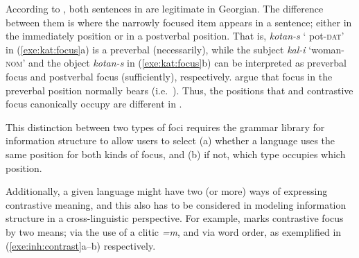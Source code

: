 

\noindent According to \citeauthor{skopeteas:fanselow:10}, both
sentences in  are legitimate in Georgian. The
difference between them is where the narrowly focused item appears in
a sentence; either in the immediately  position or in a
postverbal position. That is, \textit{kotan-s} ` pot-\textsc{dat}' in
(\ref{exe:kat:focus}a) is a preverbal  (necessarily), while the
subject \textit{kal-i} `woman-\textsc{nom}' and the object
\textit{kotan-s} in (\ref{exe:kat:focus}b) can be interpreted as
preverbal focus and postverbal focus (sufficiently), respectively.
\citeauthor{skopeteas:fanselow:10} argue that focus in the preverbal
position normally bears  (i.e.\ ).
Thus, the positions that  and contrastive
focus canonically occupy are different in .

This distinction between two types of foci requires the grammar
library for information structure to allow users to select (a) whether a
language uses the same position for both kinds of focus, and (b) if
not, which type occupies which position.


Additionally, a given language might have two (or more) ways of
expressing contrastive meaning, and this also has to be considered in
modeling information structure in a cross-linguistic perspective.  For
example,  marks contrastive focus by two means; via the
use of a clitic \textit{=m}, and via word order, as exemplified in
(\ref{exe:inh:contrast}a--b) respectively.





